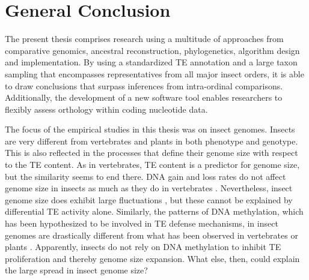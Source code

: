 \chapter{General Conclusion}
\label{conclusion}

The present thesis comprises research using a multitude of approaches
from comparative genomics, ancestral reconstruction, phylogenetics,
algorithm design and implementation. By using a standardized TE
annotation and a large taxon sampling that encompasses representatives
from all major insect orders, it is able to draw conclusions that
surpass inferences from intra-ordinal comparisons.  Additionally, the
development of a new software tool enables researchers to flexibly
assess orthology within coding nucleotide data.

The focus of the empirical studies in this thesis was on insect genomes.
Insects are very different from vertebrates and plants in both phenotype
and genotype. This is also reflected in the processes that define their
genome size with respect to the TE content. As in vertebrates, TE
content is a predictor for genome size, but the similarity seems to end
there.  DNA gain and loss rates do not affect genome size in insects as
much as they do in vertebrates \citep{Kapusta2017-1,Lindblad-Toh2005}.
Nevertheless, insect genome size does exhibit large fluctuations
\citep{Alfsnes2017}, but these cannot be explained by differential TE
activity alone. Similarly, the patterns of DNA methylation, which has
been hypothesized to be involved in TE defense mechanisms, in insect
genomes are drastically different from what has been observed in
vertebrates or plants \citep{Panagiotis2018,Suzuki2008}.  Apparently,
insects do not rely on DNA methylation to inhibit TE proliferation and
thereby genome size expansion. What else, then, could explain the large
spread in insect genome size?

